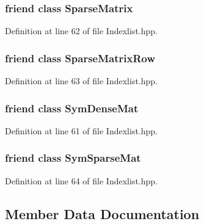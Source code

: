 \subsubsection[{SparseMatrix}]{\setlength{\rightskip}{0pt plus 5cm}friend class {\bf SparseMatrix}\hspace{0.3cm}{\ttfamily  [friend]}}\label{classIndexlist_a240abf68603784c3dcc4761f8bc41ad6}


Definition at line 62 of file Indexlist.hpp.

\subsubsection[{SparseMatrixRow}]{\setlength{\rightskip}{0pt plus 5cm}friend class {\bf SparseMatrixRow}\hspace{0.3cm}{\ttfamily  [friend]}}\label{classIndexlist_a68f9c6f33847742616d4c74f06881475}


Definition at line 63 of file Indexlist.hpp.

\subsubsection[{SymDenseMat}]{\setlength{\rightskip}{0pt plus 5cm}friend class {\bf SymDenseMat}\hspace{0.3cm}{\ttfamily  [friend]}}\label{classIndexlist_a5beabcf69cba4b4f91d6b8b3aaae3d72}


Definition at line 61 of file Indexlist.hpp.

\subsubsection[{SymSparseMat}]{\setlength{\rightskip}{0pt plus 5cm}friend class {\bf SymSparseMat}\hspace{0.3cm}{\ttfamily  [friend]}}\label{classIndexlist_a769cc6bc95fb8501b74eb4eee3bb275b}


Definition at line 64 of file Indexlist.hpp.



\subsection{Member Data Documentation}
